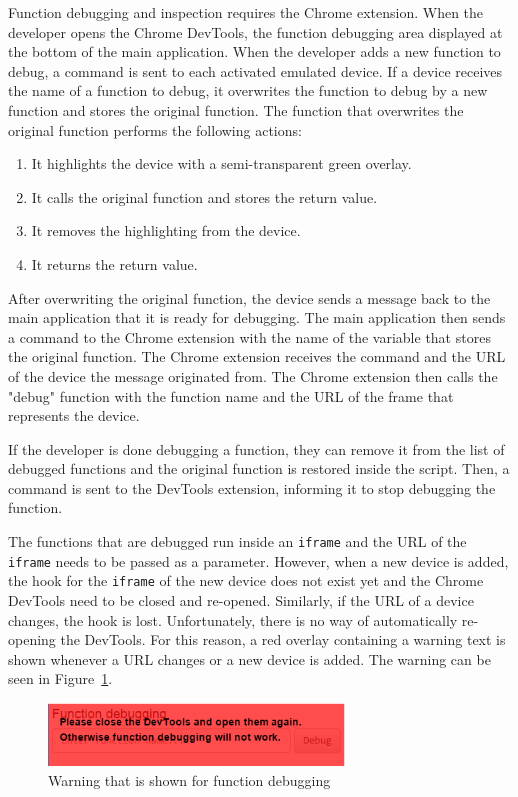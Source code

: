 Function debugging and inspection requires the Chrome extension. When the developer opens the Chrome DevTools, the function debugging area displayed at the bottom of the main application. When the developer adds a new function to debug, a command is sent to each activated emulated device. If a device receives the name of a function to debug, it overwrites the function to debug by a new function and stores the original function. The function that overwrites the original function performs the following actions:
\begin{enumerate}
	\item It highlights the device with a semi-transparent green overlay.
	\item It calls the original function and stores the return value.
	\item It removes the highlighting from the device.
	\item It returns the return value.
\end{enumerate}
After overwriting the original function, the device sends a message back to the main application that it is ready for debugging. The main application then sends a command to the Chrome extension with the name of the variable that stores the original function. The Chrome extension receives the command and the URL of the device the message originated from. The Chrome extension then calls the "debug" function with the function name and the URL of the frame that represents the device.

If the developer is done debugging a function, they can remove it from the list of debugged functions and the original function is restored inside the script. Then, a command is sent to the DevTools extension, informing it to stop debugging the function. 

The functions that are debugged run inside an \lstinline|iframe| and the URL of the \lstinline|iframe| needs to be passed as a parameter. However, when a new device is added, the hook for the \lstinline|iframe| of the new device does not exist yet and the Chrome DevTools need to be closed and re-opened. Similarly, if the URL of a device changes, the hook is lost. Unfortunately, there is no way of automatically re-opening the DevTools. For this reason, a red overlay containing a warning text is shown whenever a URL changes or a new device is added. The warning can be seen in Figure~\ref{fig:warning}.

\begin{figure}[H]
  \centering
    \includegraphics[width=0.7\textwidth]{images/screenshots/warning.png}
	\caption[Screenshot: Function debugging warning]{Warning that is shown for function debugging}
	\label{fig:warning}
\end{figure}

